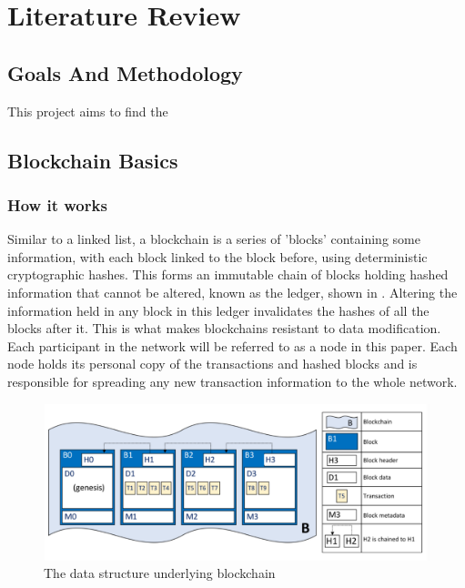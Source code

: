 \chapter{Literature Review}

\section{Goals And Methodology}
This project aims to find the


\section{Blockchain Basics}





\subsection{How it works}

Similar to a linked list, a blockchain is a series of 'blocks' containing some information, with each block linked to the block before, using deterministic cryptographic hashes. This forms an immutable chain of blocks holding hashed information that cannot be altered, known as the ledger, shown in . Altering the information held in any block in this ledger invalidates the hashes of all the blocks after it. This is what makes blockchains resistant to data modification. Each participant in the network will be referred to as a node in this paper. Each node holds its personal copy of the transactions and hashed blocks and is responsible for spreading any new transaction information to the whole network.

\begin{figure}[h]
    \centering
    \includegraphics[width=13cm,center]{Figures/BlockchainStructure.png}
    \caption{The data structure underlying blockchain \cite{ADocumentation}}
    \label{Figure:BasicBlockchain}
\end{figure}


